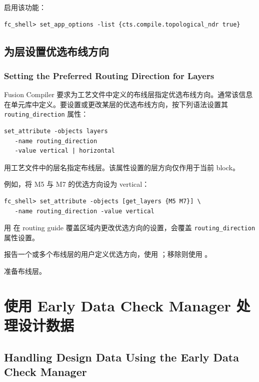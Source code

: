 启用该功能：
\begin{lstlisting}
fc_shell> set_app_options -list {cts.compile.topological_ndr true}
\end{lstlisting}

\subsection{为层设置优选布线方向}
\subsubsection*{Setting the Preferred Routing Direction for Layers}

Fusion Compiler 要求为工艺文件中定义的布线层指定优选布线方向。通常该信息在单元库中定义。要设置或更改某层的优选布线方向，按下列语法设置其 \texttt{routing\_direction} 属性：
\begin{lstlisting}
set_attribute -objects layers
   -name routing_direction
   -value vertical | horizontal
\end{lstlisting}

用工艺文件中的层名指定布线层。该属性设置的层方向仅作用于当前 block。

例如，将 M5 与 M7 的优选方向设为 vertical：
\begin{lstlisting}
fc_shell> set_attribute -objects [get_layers {M5 M7}] \
   -name routing_direction -value vertical
\end{lstlisting}

\begin{noteBox}
用  在 routing guide 覆盖区域内更改优选方向的设置，会覆盖 \texttt{routing\_direction} 属性设置。
\end{noteBox}

报告一个或多个布线层的用户定义优选方向，使用 ；移除则使用 。

\begin{seeAlsoBox}
准备布线层。
\end{seeAlsoBox}

\section{使用 Early Data Check Manager 处理设计数据}
\subsection*{Handling Design Data Using the Early Data Check Manager}

